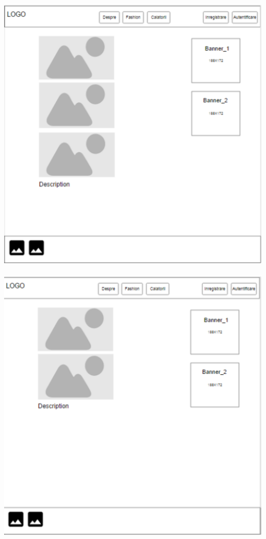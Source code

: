 \includegraphics[width=\textwidth]{3.eps}
~\\
\includegraphics[width=\textwidth]{4.eps}
\clearpage

